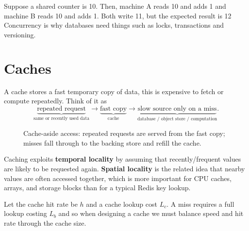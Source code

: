 Suppose a shared counter is 10.
Then, machine A reads 10 and adds 1 and machine B reads 10 and adds 1.
Both write 11, but the expected result is 12
Concurrency is why databases need things such as locks, transactions and versioning.

\section{Caches}
\label{sec:caches}
A cache stores a fast temporary copy of data, this is expensive to fetch or compute repeatedly.
Think of it as
\[
\underbrace{\text{repeated request}}_{\text{same or recently used data}}
\rightarrow
\underbrace{\text{fast copy}}_{\text{cache}}
\rightarrow
\underbrace{\text{slow source only on a miss}}_{\text{database / object store / computation}}.
\]

\begin{figure}[htbp]
\centering
{}
\caption{Cache-aside access: repeated requests are served from the fast copy; misses fall through to the backing store and refill the cache.}
\label{fig:cache-aside-overview}
\end{figure}

Caching exploits \textbf{temporal locality} by assuming that recently/frequent values are likely to be requested again.
\textbf{Spatial locality} is the related idea that nearby values are often accessed together, which is more important for CPU caches, arrays, and storage blocks than for a typical Redis key lookup.

Let the cache hit rate be $h$ and a cache lookup cost \(L_c\). 
A miss requires a full lookup costing \(L_b\) and so when designing a cache we must balance speed and hit rate through the cache size. 

